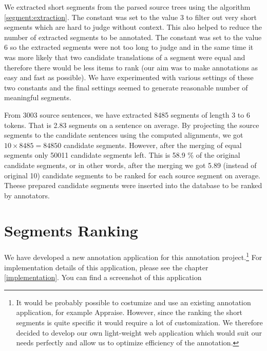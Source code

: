We extracted short segments from the parsed source trees using the algorithm
\ref{segment:extraction}. The constant  was set to
the value 3 to filter out very short segments which are hard to judge without
context. This also helped to reduce the number of extracted segments to be
annotated. The constant  was set to the value 6 so
the extracted segments were not too long to judge and in the same time it was
more likely that two candidate translations of a segment were equal and
therefore there would be less items to rank (our aim was to make annotations as
easy and fast as possible). We have experimented with various settings of these
two constants and the final settings seemed to generate reasonable number of
meaningful segments.


From 3003 source sentences, we have extracted 8485 segments of length 3 to 6
tokens. That is  2.83 segments on a sentence on average. By
projecting the source segments to the candidate sentences using the computed
alignments, we got $10 \times 8485 = 84850$ candidate segments. However, after
the merging of equal segments only 50011 candidate segments left. This is 58.9
\% of the original candidate segments, or in other words, after the merging we
got 5.89 (instead of original 10) candidate segments to be ranked for each
source segment on average. Theese prepared candidate segments were inserted
into the database to be ranked by annotators.

\section{Segments Ranking}

We have developed a new annotation application for this annotation
project.\footnote{It would be probably possible to costumize and use an existing
annotation application, for example Appraise. However, since
the ranking the short segments is quite specific it would require a lot of
customization. We therefore decided to develop our own light-weight web
application which would suit our needs perfectly and allow us to optimize
efficiency of the annotation.} For implementation details of this application,
please see the chapter \ref{implementation}. You can find a screenshot of this
application


